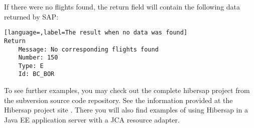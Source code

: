 If there were no flights found, the return field will contain the following data returned by SAP:

\begin{lstlisting}[language=,label=The result when no data was found]
Return
	Message: No corresponding flights found
	Number: 150
	Type: E
	Id: BC_BOR
\end{lstlisting}

To see further examples, you may check out the complete hibersap project from the subversion source code repository. See the information provided at the Hibersap project site \urlHibersapSite. There you will also find examples of using Hibersap in a Java EE application server with a JCA resource adapter. 

